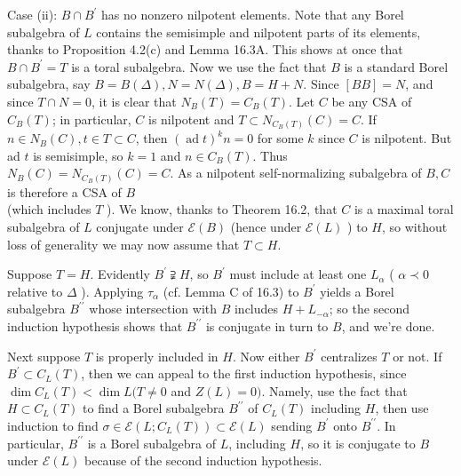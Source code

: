 \documentclass[10pt]{article}
\begin{document}
Case (ii): $B \cap B^{\prime}$ has no nonzero nilpotent elements. Note that any Borel subalgebra of $L$ contains the semisimple and nilpotent parts of its elements, thanks to Proposition 4.2(c) and Lemma 16.3A. This shows at once that $B \cap B^{\prime}=T$ is a toral subalgebra. Now we use the fact that $B$ is a standard Borel subalgebra, say $B=B(\Delta), N=N(\Delta), B=H+N$. Since $[B B]=N$, and since $T \cap N=0$, it is clear that $N_{B}(T)=C_{B}(T)$. Let $C$ be any CSA of $C_{B}(T)$; in particular, $C$ is nilpotent and $T \subset N_{C_{B}(T)}(C)=C$. If $n \in N_{B}(C), t \in T \subset C$, then $(\operatorname{ad} t)^{k} n=0$ for some $k$ since $C$ is nilpotent. But ad $t$ is semisimple, so $k=1$ and $n \in C_{B}(T)$. Thus $N_{B}(C)=N_{C_{B}(T)}(C)=C$. As a nilpotent self-normalizing subalgebra of $B, C$ is therefore a CSA of $B$\\
(which includes $T$ ). We know, thanks to Theorem 16.2, that $C$ is a maximal toral subalgebra of $L$ conjugate under $\mathscr{E}(B)$ (hence under $\mathscr{E}(L)$ ) to $H$, so without loss of generality we may now assume that $T \subset H$.

Suppose $T=H$. Evidently $B^{\prime} \supsetneqq H$, so $B^{\prime}$ must include at least one $L_{\alpha}$ ( $\alpha \prec 0$ relative to $\Delta$ ). Applying $\tau_{\alpha}$ (cf. Lemma C of 16.3) to $B^{\prime}$ yields a Borel subalgebra $B^{\prime \prime}$ whose intersection with $B$ includes $H+L_{-\alpha}$; so the second induction hypothesis shows that $B^{\prime \prime}$ is conjugate in turn to $B$, and we're done.

Next suppose $T$ is properly included in $H$. Now either $B^{\prime}$ centralizes $T$ or not. If $B^{\prime} \subset C_{L}(T)$, then we can appeal to the first induction hypothesis, since $\operatorname{dim} C_{L}(T)<\operatorname{dim} L(T \neq 0$ and $Z(L)=0)$. Namely, use the fact that $H \subset C_{L}(T)$ to find a Borel subalgebra $B^{\prime \prime}$ of $C_{L}(T)$ including $H$, then use induction to find $\sigma \in \mathscr{E}\left(L ; C_{L}(T)\right) \subset \mathscr{E}(L)$ sending $B^{\prime}$ onto $B^{\prime \prime}$. In particular, $B^{\prime \prime}$ is a Borel subalgebra of $L$, including $H$, so it is conjugate to $B$ under $\mathscr{E}(L)$ because of the second induction hypothesis.
\end{document}

